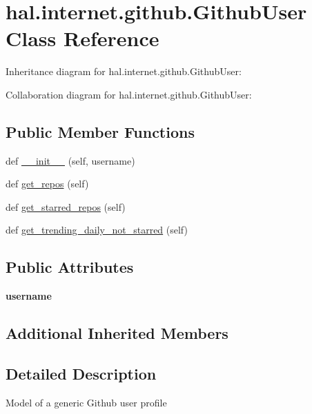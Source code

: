 \hypertarget{classhal_1_1internet_1_1github_1_1_github_user}{}\section{hal.\+internet.\+github.\+Github\+User Class Reference}
\label{classhal_1_1internet_1_1github_1_1_github_user}


Inheritance diagram for hal.\+internet.\+github.\+Github\+User\+:


Collaboration diagram for hal.\+internet.\+github.\+Github\+User\+:
\subsection*{Public Member Functions}
\begin{DoxyCompactItemize}
\item 
def \hyperlink{classhal_1_1internet_1_1github_1_1_github_user_a045563a8b0c55793d7a054a38ac8e6e7}{\+\_\+\+\_\+init\+\_\+\+\_\+} (self, username)
\item 
def \hyperlink{classhal_1_1internet_1_1github_1_1_github_user_a61ee4bb9d16a50058a8d5e125ef5197f}{get\+\_\+repos} (self)
\item 
def \hyperlink{classhal_1_1internet_1_1github_1_1_github_user_a4affc82985348023676461d9ee29d513}{get\+\_\+starred\+\_\+repos} (self)
\item 
def \hyperlink{classhal_1_1internet_1_1github_1_1_github_user_a15a4fec1eb59b1227c7167ef2b45eb49}{get\+\_\+trending\+\_\+daily\+\_\+not\+\_\+starred} (self)
\end{DoxyCompactItemize}
\subsection*{Public Attributes}
\begin{DoxyCompactItemize}
\item 
{\bfseries username}\hypertarget{classhal_1_1internet_1_1github_1_1_github_user_ad7989a82d32e1a582e5847e87cacb2c0}{}\label{classhal_1_1internet_1_1github_1_1_github_user_ad7989a82d32e1a582e5847e87cacb2c0}

\end{DoxyCompactItemize}
\subsection*{Additional Inherited Members}


\subsection{Detailed Description}
\begin{DoxyVerb}Model of a generic Github user profile \end{DoxyVerb}
 

